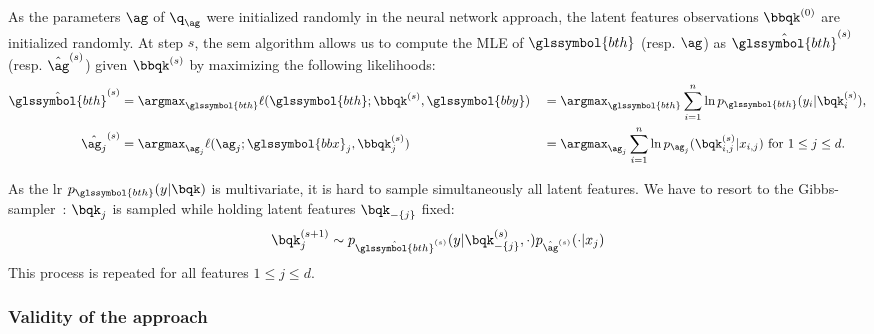 As the parameters $\ag$ of $\q_{\ag}$ were initialized randomly in the neural network approach, the latent features observations $\bbqk^{(0)}$ are initialized randomly. At step $s$, the \gls{sem} algorithm allows us to compute the MLE of $\glssymbol{bth}$ (resp. $\ag$) as $\hat{\glssymbol{bth}}^{(s)}$ (resp. $\hat{\ag}^{(s)}$) given $\bbqk^{(s)}$ by maximizing the following likelihoods:
\begin{alignat}{2}
\hat{\glssymbol{bth}}^{(s)} & = \argmax_{\glssymbol{bth}} \ell(\glssymbol{bth}; \bbqk^{(s)}, \glssymbol{bby}) && = \argmax_{\glssymbol{bth}} \sum_{i=1}^n \ln p_{\glssymbol{bth}}(y_i | \bqk^{(s)}_i), \nonumber \\
\hat{\ag_j}^{(s)} & = \argmax_{\ag_j} \ell(\ag_j; \glssymbol{bbx}_j, \bbqk^{(s)}_j) && = \argmax_{\ag_j} \sum_{i=1}^n \ln p_{\ag_j}(\bqk^{(s)}_{i,j} | x_{i,j}) \text{ for } 1 \leq j \leq d. \label{eq:mle_ag}
\end{alignat}

As the \gls{lr} $p_{\glssymbol{bth}}(y | \bqk)$ is multivariate, it is hard to sample simultaneously all latent features. We have to resort to the Gibbs-sampler~\cite{casella1992explaining}: $\bqk_j$ is sampled while holding latent features $\bqk_{-\{j\}}$ fixed:
\begin{equation} \label{eq:q_draw}
\bqk_j^{(s+1)} \sim p_{\hat{\glssymbol{bth}}^{(s)}}(y | \bqk_{-\{j\}}^{(s)}, \cdot) p_{\hat{\ag}^{(s)}}(\cdot | x_j)
\end{equation}
This process is repeated for all features $1 \leq j \leq d$.



\subsubsection{Validity of the approach}

